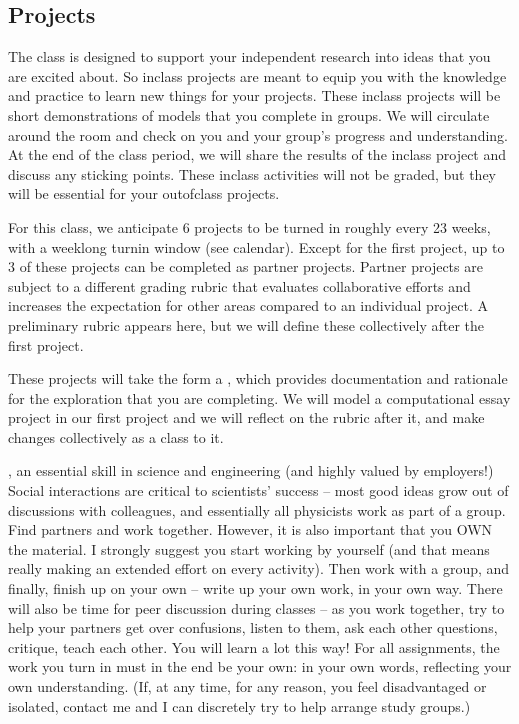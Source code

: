\documentclass[letterpaper,10pt,english]{jupyterBook}
\begin{document}
\subsection{Projects}
\label{\detokenize{content/0_course/2_design:projects}}
\sphinxAtStartPar
{} The class is designed to support your independent research into ideas that you are excited about. So in\sphinxhyphen{}class projects are meant to equip you with the knowledge and practice to learn new things for your projects. These in\sphinxhyphen{}class projects will be short demonstrations of models that you complete in groups. We will circulate around the room and check on you and your group’s progress and understanding. At the end of the class period, we will share the results of the in\sphinxhyphen{}class project and discuss any sticking points. These in\sphinxhyphen{}class activities will not be graded, but they will be essential for your out\sphinxhyphen{}of\sphinxhyphen{}class projects.

\sphinxAtStartPar
{} For this class, we anticipate 6 projects to be turned in roughly every 2\sphinxhyphen{}3 weeks, with a weeklong turn\sphinxhyphen{}in window (see calendar). Except for the first project, up to 3 of these projects can be completed as partner projects. Partner projects are subject to a different grading rubric that evaluates collaborative efforts and increases the expectation for other areas compared to an individual project. A preliminary rubric appears here, but we will define these collectively after the first project.

\sphinxAtStartPar
These projects will take the form a , which provides documentation and rationale for the exploration that you are completing. We will model a computational essay project in our first project and we will reflect on the rubric after it, and make changes collectively as a class to it.

\sphinxAtStartPar
{}, an essential skill in science and engineering (and highly valued by employers!) Social interactions are critical to scientists’ success – most good ideas grow out of discussions with colleagues, and essentially all physicists work as part of a group. Find partners and work together. However, it is also important that you OWN the material. I strongly suggest you start working by yourself (and that means really making an extended effort on every activity). Then work with a group, and finally, finish up on your own – write up your own work, in your own way. There will also be time for peer discussion during classes – as you work together, try to help your partners get over confusions, listen to them, ask each other questions, critique, teach each other. You will learn a lot this way! For all assignments, the work you turn in must in the end be your own: in your own words, reflecting your own understanding. (If, at any time, for any reason, you feel disadvantaged or isolated, contact me and I can discretely try to help arrange study groups.)
\end{document}
